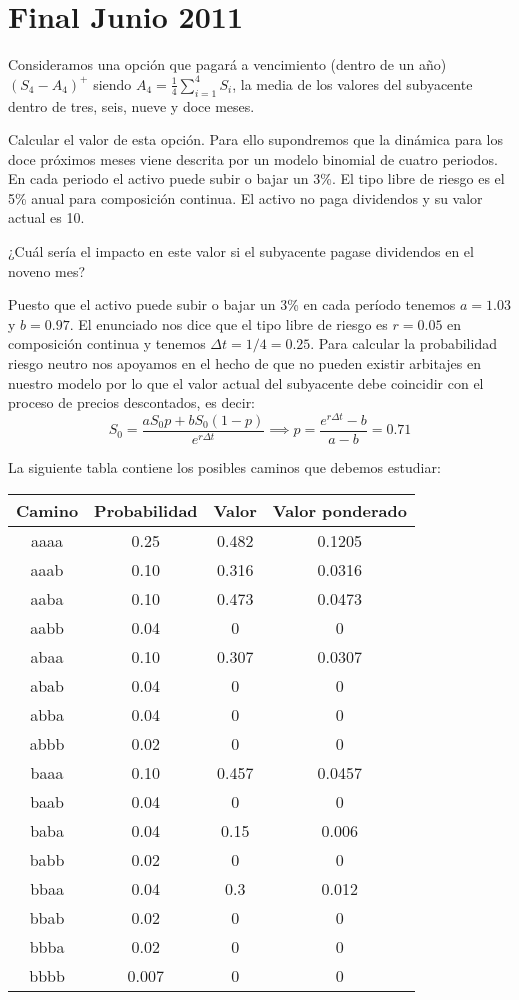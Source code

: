 \section{Final Junio 2011}
\begin{problem}[1]
Consideramos una opción que pagará a vencimiento (dentro de un año) $(S_4-A_4)^+$ siendo $A_4=\frac{1}{4}\sum_{i=1}^4S_i$, la media de los valores del subyacente dentro de tres, seis, nueve y doce meses.

\ppart Calcular el valor de esta opción. Para ello supondremos que la dinámica para los doce próximos meses viene descrita por un modelo binomial de cuatro periodos. En cada periodo el activo puede subir o bajar un 3\%. El tipo libre de riesgo es el 5\% anual para composición continua. El activo no paga dividendos y su valor actual es 10.

\ppart ¿Cuál sería el impacto en este valor si el subyacente pagase dividendos en el noveno mes?

\solution
{}

\spart

Puesto que el activo puede subir o bajar un 3\% en cada período tenemos $a=1.03$ y $b=0.97$. El enunciado nos dice que el tipo libre de riesgo es $r=0.05$ en composición continua y tenemos $Δt=1/4=0.25$. Para calcular la probabilidad riesgo neutro nos apoyamos en el hecho de que no pueden existir arbitajes en nuestro modelo por lo que el valor actual del subyacente debe coincidir con el proceso de precios descontados, es decir:
\[S_0 = \frac{aS_0p + bS_0(1-p)}{e^{rΔt}} \implies p = \frac{e^{rΔt}-b}{a-b} = 0.71\]

La siguiente tabla contiene los posibles caminos que debemos estudiar:

\begin{center}
\begin{tabular}{|c|c|c|c|}
\hline
\textbf{Camino} & \textbf{Probabilidad} & \textbf{Valor} & \textbf{Valor ponderado}\\
\hline
aaaa & 0.25  & 0.482 & 0.1205 \\
aaab & 0.10  & 0.316 & 0.0316 \\
aaba & 0.10  & 0.473 & 0.0473 \\
aabb & 0.04  & 0     & 0 \\
abaa & 0.10  & 0.307 & 0.0307 \\
abab & 0.04  & 0     & 0 \\
abba & 0.04  & 0     & 0 \\
abbb & 0.02  & 0     & 0 \\
baaa & 0.10  & 0.457 & 0.0457 \\
baab & 0.04  & 0     & 0\\
baba & 0.04  & 0.15  & 0.006 \\
babb & 0.02  & 0     & 0 \\
bbaa & 0.04  & 0.3   & 0.012 \\
bbab & 0.02  & 0     & 0 \\
bbba & 0.02  & 0     & 0 \\
bbbb & 0.007 & 0     & 0 \\
\hline
\end{tabular}
\end{center}


\end{problem}
